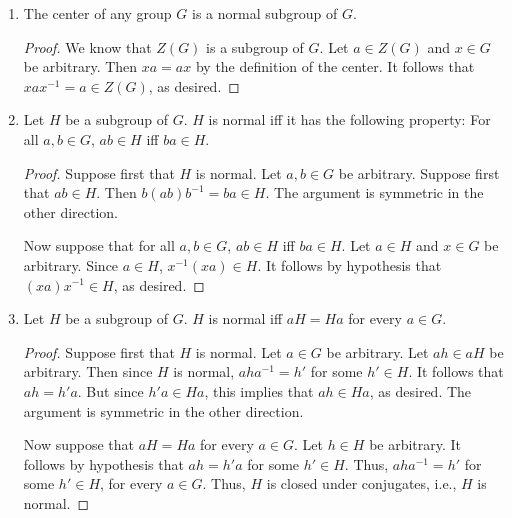 \documentclass[../notes.tex]{subfiles}
\begin{document}
\begin{enumerate}[label={\textbf{\Alph*.}}]
\begin{enumerate}
\begin{proof}
        \end{proof}
        \item The center of any group $G$ is a normal subgroup of $G$.
        \begin{proof}
            We know that $Z(G)$ is a subgroup of $G$. Let $a\in Z(G)$ and $x\in G$ be arbitrary. Then $xa=ax$ by the definition of the center. It follows that $xax^{-1}=a\in Z(G)$, as desired.
        \end{proof}
        \item Let $H$ be a subgroup of $G$. $H$ is normal iff it has the following property: For all $a,b\in G$, $ab\in H$ iff $ba\in H$.
        \begin{proof}
            Suppose first that $H$ is normal. Let $a,b\in G$ be arbitrary. Suppose first that $ab\in H$. Then $b(ab)b^{-1}=ba\in H$. The argument is symmetric in the other direction.\par
            Now suppose that for all $a,b\in G$, $ab\in H$ iff $ba\in H$. Let $a\in H$ and $x\in G$ be arbitrary. Since $a\in H$, $x^{-1}(xa)\in H$. It follows by hypothesis that $(xa)x^{-1}\in H$, as desired.
        \end{proof}
        \item Let $H$ be a subgroup of $G$. $H$ is normal iff $aH=Ha$ for every $a\in G$.
        \begin{proof}
            Suppose first that $H$ is normal. Let $a\in G$ be arbitrary. Let $ah\in aH$ be arbitrary. Then since $H$ is normal, $aha^{-1}=h'$ for some $h'\in H$. It follows that $ah=h'a$. But since $h'a\in Ha$, this implies that $ah\in Ha$, as desired. The argument is symmetric in the other direction.\par
            Now suppose that $aH=Ha$ for every $a\in G$. Let $h\in H$ be arbitrary. It follows by hypothesis that $ah=h'a$ for some $h'\in H$. Thus, $aha^{-1}=h'$ for some $h'\in H$, for every $a\in G$. Thus, $H$ is closed under conjugates, i.e., $H$ is normal.
        \end{proof}
    \end{enumerate}
\end{enumerate}
\end{document}
